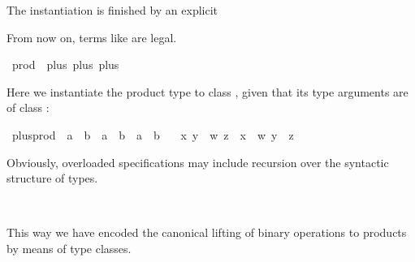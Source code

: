 \begin{isabellebody}
\begin{isamarkuptext}
The instantiation is finished by an explicit%
\end{isamarkuptext}%
\isamarkuptrue%
\isamarkupfalse%
%
\begin{isamarkuptext}%
\noindent From now on, terms like  are
legal.%
\end{isamarkuptext}%
\isamarkuptrue%
\isamarkupfalse%
\ prod\ {\isacharcolon}{\isacharcolon}\ {\isacharparenleft}plus{\isacharcomma}\ plus{\isacharparenright}\ plus\isanewline
{}%
\begin{isamarkuptext}%
\noindent Here we instantiate the product type  to
class , given that its type arguments are of
class :%
\end{isamarkuptext}%
\isamarkuptrue%
\isamarkupfalse%
\ plus{\isacharunderscore}prod\ {\isacharcolon}{\isacharcolon}\ {\isachardoublequoteopen}{\isacharprime}a\ {\isasymtimes}\ {\isacharprime}b\ {\isasymRightarrow}\ {\isacharprime}a\ {\isasymtimes}\ {\isacharprime}b\ {\isasymRightarrow}\ {\isacharprime}a\ {\isasymtimes}\ {\isacharprime}b{\isachardoublequoteclose}\ \isanewline
\ \ {\isachardoublequoteopen}{\isacharparenleft}x{\isacharcomma}\ y{\isacharparenright}\ {\isasymoplus}\ {\isacharparenleft}w{\isacharcomma}\ z{\isacharparenright}\ {\isacharequal}\ {\isacharparenleft}x\ {\isasymoplus}\ w{\isacharcomma}\ y\ {\isasymoplus}\ z{\isacharparenright}{\isachardoublequoteclose}%
\begin{isamarkuptext}%
\noindent Obviously, overloaded specifications may include
recursion over the syntactic structure of types.%
\end{isamarkuptext}%
\isamarkuptrue%
\isamarkupfalse%
%
\isadelimproof
\ %
\endisadelimproof
%
\isatagproof
\isacommand{{\isachardot}{\isachardot}}\isamarkupfalse%
%
\endisatagproof
{\isafoldproof}%
%
\isadelimproof
%
\endisadelimproof
\isanewline
\isanewline
{}\isamarkupfalse%
%
\begin{isamarkuptext}%
\noindent This way we have encoded the canonical lifting of
binary operations to products by means of type classes.%
\end{isamarkuptext}%
\isamarkuptrue%
%
\isadelimtheory
%
\endisadelimtheory
%
\isatagtheory
%
\endisatagtheory
{\isafoldtheory}%
%
\isadelimtheory
%
\endisadelimtheory
\end{isabellebody}%
